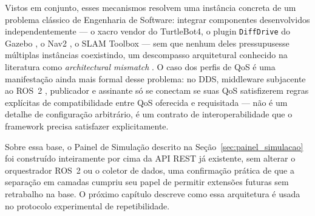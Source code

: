 Vistos em conjunto, esses mecanismos resolvem uma instância concreta de um
problema clássico de Engenharia de Software: integrar componentes
desenvolvidos independentemente --- o xacro vendor do TurtleBot4, o plugin
\texttt{DiffDrive} do Gazebo \cite{koenig2004gazebo}, o Nav2 \cite{macenski2020marathon}, o SLAM Toolbox \cite{macenski2021slam} --- sem que nenhum
deles pressupusesse múltiplas instâncias coexistindo, um descompasso
arquitetural conhecido na literatura como \textit{architectural mismatch}
\cite{garlan1995architectural}. O caso dos perfis de QoS é uma
manifestação ainda mais formal desse problema: no DDS, middleware
subjacente ao ROS~2 \cite{pardocastellote2003dds}, publicador e assinante
só se conectam se suas QoS satisfizerem regras explícitas de
compatibilidade entre QoS oferecida e requisitada \cite{omgdds2015} ---
não é um detalhe de configuração arbitrário, é um contrato de
interoperabilidade que o framework precisa satisfazer explicitamente.

Sobre essa base, o Painel de Simulação descrito na
Seção~\ref{sec:painel_simulacao} foi construído inteiramente por cima da API
REST já existente, sem alterar o orquestrador ROS~2 ou o coletor de dados,
uma confirmação prática de que a separação em camadas cumpriu seu papel de
permitir extensões futuras sem retrabalho na base. O próximo capítulo descreve
como essa arquitetura é usada no protocolo experimental de repetibilidade.
